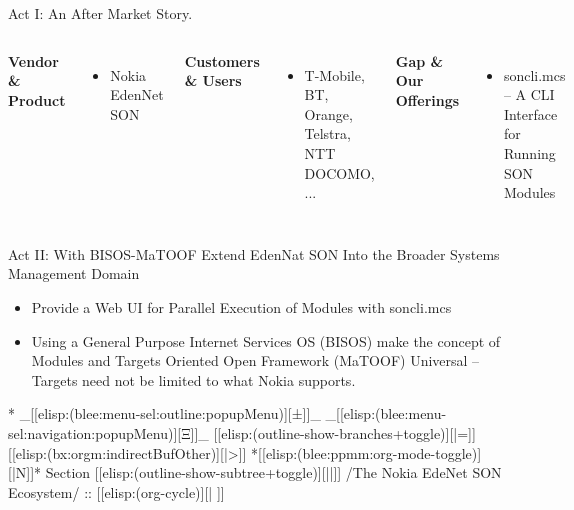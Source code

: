 \begin{whenOrg}
\begin{verblatex}
\begin{frame}[fragile,plain,label=summary]
    \begin{exampleblock}{Act I: An After Market Story.}
    \end{exampleblock}

    \begin{columns}[T]

\textbf{Vendor \& Product}
\begin{itemize}
  \item Nokia EdenNet SON
\end{itemize}


\textbf{Customers \& Users}
\begin{itemize}
  \item T-Mobile, BT, Orange, Telstra, NTT DOCOMO, ...
\end{itemize}


\textbf{Gap \& Our Offerings}
\begin{itemize}
  \item soncli.mcs -- A CLI Interface for Running SON Modules
\end{itemize}

\end{columns}

      \begin{block}{Act II: With BISOS-MaTOOF}
          Extend EdenNat SON Into the Broader Systems Management Domain
    \end{block}

\begin{itemize}
  \item Provide a Web UI for Parallel Execution of  Modules with soncli.mcs
  \item Using a General Purpose Internet Services OS (BISOS) make the
    concept of Modules and Targets Oriented Open Framework (MaTOOF) Universal -- Targets need not
    be limited to what Nokia supports.
\end{itemize}



\end{frame}
\end{verblatex}



\begin{whenOrg}
*  _[[elisp:(blee:menu-sel:outline:popupMenu)][±]]_ _[[elisp:(blee:menu-sel:navigation:popupMenu)][Ξ]]_ [[elisp:(outline-show-branches+toggle)][|=]] [[elisp:(bx:orgm:indirectBufOther)][|>]] *[[elisp:(blee:ppmm:org-mode-toggle)][|N]]*  Section    [[elisp:(outline-show-subtree+toggle)][||]]   /The Nokia EdeNet SON Ecosystem/ ::  [[elisp:(org-cycle)][| ]]
\end{whenOrg}


\end{whenOrg}
